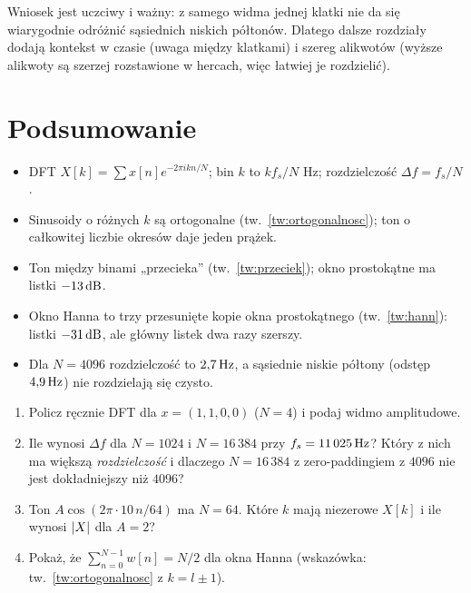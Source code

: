 Wniosek jest uczciwy i ważny: z samego widma jednej klatki nie da się wiarygodnie odróżnić sąsiednich niskich półtonów.
Dlatego dalsze rozdziały dodają kontekst w czasie (uwaga między klatkami) i szereg alikwotów (wyższe alikwoty są szerzej rozstawione
w hercach, więc łatwiej je rozdzielić).

\section*{Podsumowanie}
\begin{itemize}
\item DFT $X[k]=\sum x[n]e^{-2\pi ikn/N}$; bin $k$ to $kf_s/N$ Hz; rozdzielczość $\Delta f=f_s/N$.
\item Sinusoidy o różnych $k$ są ortogonalne (tw.~\ref{tw:ortogonalnosc}); ton o całkowitej liczbie okresów daje jeden prążek.
\item Ton między binami „przecieka” (tw.~\ref{tw:przeciek}); okno prostokątne ma listki $-13\,\mathrm{dB}$.
\item Okno Hanna to trzy przesunięte kopie okna prostokątnego (tw.~\ref{tw:hann}): listki $-31\,\mathrm{dB}$, ale główny listek dwa razy szerszy.
\item Dla $N=4096$ rozdzielczość to $2{,}7\,\mathrm{Hz}$, a sąsiednie niskie półtony (odstęp $4{,}9\,\mathrm{Hz}$) nie rozdzielają się czysto.
\end{itemize}

\begin{sprawdz}
\begin{enumerate}
\item Policz ręcznie DFT dla $x=(1,1,0,0)$ ($N=4$) i podaj widmo amplitudowe.
\item Ile wynosi $\Delta f$ dla $N=1024$ i $N=16\,384$ przy $f_s=11\,025\,\mathrm{Hz}$? Który z nich ma większą \emph{rozdzielczość} i dlaczego $N=16\,384$ z zero-paddingiem z $4096$ nie jest dokładniejszy niż $4096$?
\item Ton $A\cos(2\pi\cdot 10\,n/64)$ ma $N=64$. Które $k$ mają niezerowe $X[k]$ i ile wynosi $\left\lvert X\right\rvert$ dla $A=2$?
\item Pokaż, że $\sum_{n=0}^{N-1}w[n]=N/2$ dla okna Hanna (wskazówka: tw.~\ref{tw:ortogonalnosc} z $k=l\pm1$).
\end{enumerate}
\end{sprawdz}


